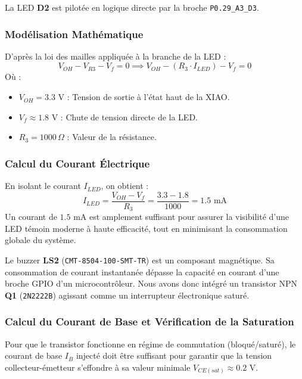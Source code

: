 La LED \textbf{D2} est pilotée en logique directe par la broche \texttt{P0.29\_A3\_D3}.

\subsubsection*{Modélisation Mathématique}
D'après la loi des mailles appliquée à la branche de la LED :
\begin{equation}
    V_{OH} - V_{R3} - V_f = 0 \implies V_{OH} - (R_3 \cdot I_{LED}) - V_f = 0
\end{equation}
Où :
\begin{itemize}
    \item $V_{OH} = 3.3\text{ V}$ : Tension de sortie à l'état haut de la XIAO.
    \item $V_f \approx 1.8\text{ V}$ : Chute de tension directe de la LED.
    \item $R_3 = 1000\,\Omega$ : Valeur de la résistance.
\end{itemize}

\subsubsection*{Calcul du Courant Électrique}
En isolant le courant $I_{LED}$, on obtient :
\begin{equation}
    I_{LED} = \frac{V_{OH} - V_f}{R_3} = \frac{3.3 - 1.8}{1000} = 1.5\text{ mA}
\end{equation}
Un courant de $1.5\text{ mA}$ est amplement suffisant pour assurer la visibilité d'une LED
témoin moderne à haute efficacité, tout en minimisant la consommation globale du système.
\bigskip

Le buzzer \textbf{LS2} (\texttt{CMT-8504-100-SMT-TR}) \cite{CMT-8504-100-SMT-TR} est un composant magnétique. 
Sa consommation de courant instantanée dépasse la capacité en courant d'une broche GPIO d'un microcontrôleur.
Nous avons donc intégré un transistor NPN \textbf{Q1} (\texttt{2N2222B}) \cite{2N2222} agissant comme 
un interrupteur électronique saturé.

\subsubsection*{Calcul du Courant de Base et Vérification de la Saturation}
Pour que le transistor fonctionne en régime de commutation (bloqué/saturé), 
le courant de base $I_B$ injecté doit être suffisant pour garantir que la tension
collecteur-émetteur s'effondre à sa valeur minimale $V_{CE(sat)} \approx 0.2\text{ V}$.

